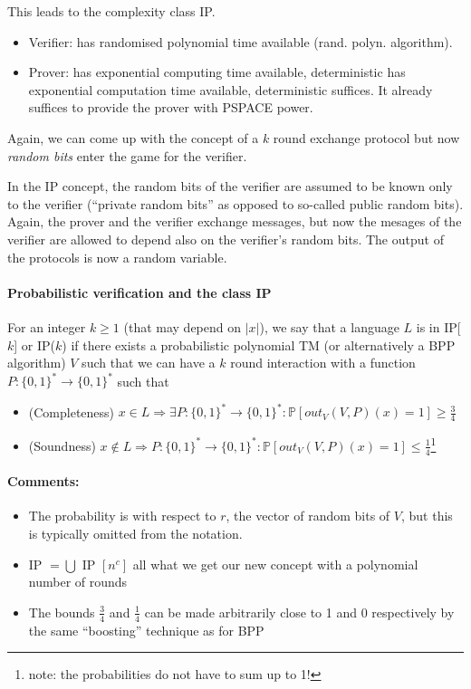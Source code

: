 \documentclass[11pt]{article}
\theoremstyle{definition}
\theoremstyle{definition}
\begin{document}
This leads to the complexity class IP.

\begin{itemize}
\item Verifier: has randomised polynomial time available (rand. polyn. algorithm).
\item Prover: has exponential computing time available, deterministic has exponential computation time available, deterministic suffices. It already suffices to provide the prover with PSPACE power.
\end{itemize}

Again, we can come up with the concept of a $ k $ round exchange protocol but now \textit{random bits} enter the game for the verifier.

In the IP concept, the random bits of the verifier are assumed to be known only to the verifier (``private random bits'' as opposed to so-called public random bits). Again, the prover and the verifier exchange messages, but now the mesages of the verifier are allowed to depend also on the verifier's random bits. The output of the protocols is now a random variable.

\paragraph{Probabilistic verification and the class IP}
For an integer $ k \geq 1 $ (that may depend on $ | x | $), we say that a language $ L $ is in IP[$k$] or IP($k$) if there exists a probabilistic polynomial TM (or alternatively a BPP algorithm) $ V $ such that we can have a $ k $ round interaction with a function $ P : \{ 0, 1\}^\ast \rightarrow \{0, 1\}^\ast $ such that
\begin{itemize}
\item (Completeness) $ x \in L \Rightarrow \exists P: \{0, 1\}^\ast \rightarrow \{0, 1\}^\ast: \mathbb{P}[out_V(V, P)(x) = 1] \geq \frac{3}{4} $
\item (Soundness) $ x \not \in L \Rightarrow P: \{0, 1\}^\ast \rightarrow \{0, 1\}^\ast : \mathbb{P}[out_V(V, P)(x) = 1] \leq \frac{1}{4} $\footnote{note: the probabilities do not have to sum up to 1!}
\end{itemize}

\paragraph{Comments:}
\begin{itemize}
\item The probability is with respect to $ r $, the vector of random bits of $ V $, but this is typically omitted from the notation.

\item IP $ = \bigcup $ IP $ [n^c] $ all what we get our new concept with a polynomial number of rounds

\item The bounds $ \frac{3}{4} $ and $ \frac{1}{4} $ can be made arbitrarily close to 1 and 0 respectively by the same ``boosting'' technique as for BPP
\end{itemize}
\end{document}
